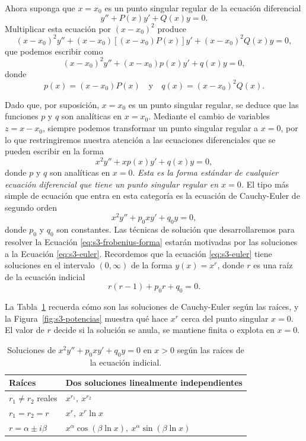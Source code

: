 \begin{remark}
    Ahora suponga que $x = x_0$ es un punto singular regular de la ecuación diferencial
\[ y'' + P(x)y' + Q(x)y = 0. \]
Multiplicar esta ecuación por $(x - x_0)^2$ produce
\[ (x - x_0)^2 y'' + (x - x_0)[(x - x_0)P(x)]y' + (x - x_0)^2 Q(x)y = 0, \]
que podemos escribir como
\[ (x - x_0)^2 y'' + (x - x_0)p(x)y' + q(x)y = 0, \]
donde
\[ p(x) = (x - x_0)P(x) \quad \text{y} \quad q(x) = (x - x_0)^2 Q(x). \]
 
Dado que, por suposición, $x = x_0$ es un punto singular regular, se deduce que las funciones $p$ y $q$ son analíticas en $x = x_0$. Mediante el cambio de variables $z = x - x_0$, siempre podemos transformar un punto singular regular a $x = 0$, por lo que restringiremos nuestra atención a las ecuaciones diferenciales que se pueden escribir en la forma
\begin{equation}
\boxed{ x^2 y'' + xp(x)y' + q(x)y = 0, }
\label{eq:s3-frobenius-forma}
\end{equation}
donde $p$ y $q$ son analíticas en $x = 0$. \textit{Esta es la forma estándar de cualquier ecuación diferencial que tiene un punto singular regular en $x = 0$.} El tipo más simple de ecuación que entra en esta categoría es la ecuación de Cauchy-Euler de segundo orden
\begin{equation}
x^2 y'' + p_0 x y' + q_0 y = 0,
\label{eq:s3-euler}
\end{equation}
donde $p_0$ y $q_0$ son constantes. Las técnicas de solución que desarrollaremos para resolver la Ecuación \eqref{eq:s3-frobenius-forma} estarán motivadas por las soluciones a la Ecuación \eqref{eq:s3-euler}. Recordemos que la ecuación \eqref{eq:s3-euler} tiene soluciones en el intervalo $(0, \infty)$ de la forma $y(x) = x^r$, donde $r$ es una raíz de la ecuación indicial
\[ r(r - 1) + p_0 r + q_0 = 0. \]
\end{remark}
 
La Tabla~\ref{tab:s3-euler} recuerda cómo son las soluciones de Cauchy-Euler según las raíces, y la Figura~\ref{fig:s3-potencias} muestra qué hace $x^r$ cerca del punto singular $x=0$. El valor de $r$ decide si la solución se anula, se mantiene finita o explota en $x=0$.
 
\begin{table}[H]
\centering
\small
\caption{Soluciones de $x^2y''+p_0xy'+q_0y=0$ en $x>0$ según las raíces de la ecuación indicial.}
\label{tab:s3-euler}
\begin{tabular}{|l|l|}
\hline
\rowcolor{bbe!15}\textbf{Raíces} & \textbf{Dos soluciones linealmente independientes} \\ \hline
$r_1\neq r_2$ reales & $x^{r_1},\ x^{r_2}$ \\ \hline
$r_1=r_2=r$ & $x^{r},\ x^{r}\ln x$ \\ \hline
$r=\alpha\pm i\beta$ & $x^{\alpha}\cos(\beta\ln x),\ x^{\alpha}\sin(\beta\ln x)$ \\ \hline
\end{tabular}
\end{table}
 
